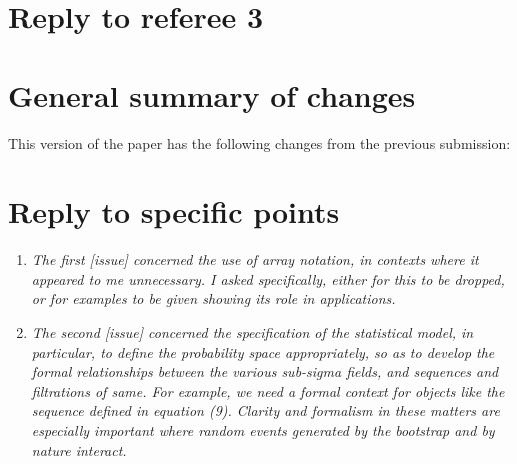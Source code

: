 \documentclass[12pt]{article}
\begin{document}
\section*{\hfill Reply to referee 3\hfill}
\section*{General summary of changes}
This version of the paper has the following changes from the
previous submission:


\section*{Reply to specific points}

\begin{enumerate}
\item \textit{The first [issue] concerned the use of array notation,
    in contexts where it appeared to me unnecessary. I asked
    specifically, either for this to be dropped, or for examples to be
    given showing its role in applications.}

\item \textit{The second [issue] concerned the specification of the
    statistical model, in particular, to define the probability space
    appropriately, so as to develop the formal relationships between
    the various sub-sigma fields, and sequences and filtrations of
    same. For example, we need a formal context for objects like the
    sequence defined in equation (9). Clarity and formalism in these
    matters are especially important where random events generated by
    the bootstrap and by nature interact.}

\end{enumerate}
\end{document}

